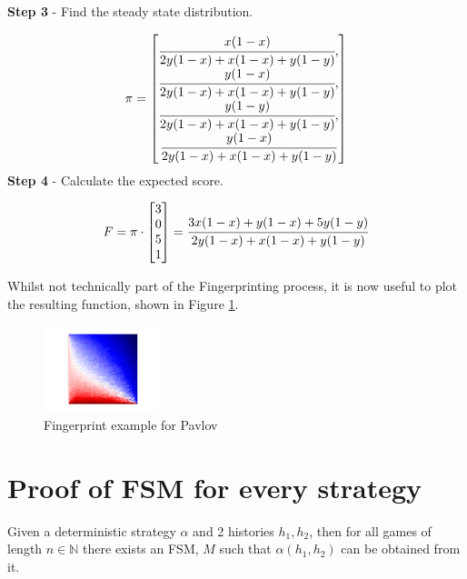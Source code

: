 \textbf{Step 3} - Find the steady state distribution.

\begin{equation}\label{eq:steady_state}
%
\pi =
\begin{bmatrix}
\cfrac{x (1 - x)}{2y(1-x) + x(1-x) + y(1-y)}, \\
\cfrac{y (1 - x)}{2y(1-x) + x(1-x) + y(1-y)}, \\
\cfrac{y (1 - y)}{2y(1-x) + x(1-x) + y(1-y)}, \\
\cfrac{y (1 - x)}{2y(1-x) + x(1-x) + y(1-y)}
\end{bmatrix}
\end{equation}
\textbf{Step 4} - Calculate the expected score.

\begin{equation}
F = \pi \cdot
\begin{bmatrix}
3 \\
0 \\
5 \\
1
\end{bmatrix}
=
\cfrac{3x(1-x) + y(1-x) + 5y(1-y)}{2y(1-x) + x(1-x) + y(1-y)}
\end{equation}

Whilst not technically part of the Fingerprinting process, it is now useful to plot the resulting function, shown in Figure \ref{fig:pavlov_fing_ex}.

\begin{figure}[htbp!]
\centering
\includegraphics[width = 0.3\textwidth]{../img/Numerical/Win-Stay-Lose-Shift}
\caption{Fingerprint example for Pavlov}
\label{fig:pavlov_fing_ex}
\end{figure}



\section{Proof of FSM for every strategy}\label{sec:fsm_proof}
\begin{theorem}\label{thm:fsm}
Given a deterministic strategy $\alpha$ and 2 histories $h_1, h_2$, then for all games of length $n \in \mathbb{N}$ there exists an FSM, $M$ such that $\alpha(h_1, h_2)$ can be obtained from it.
\end{theorem}


